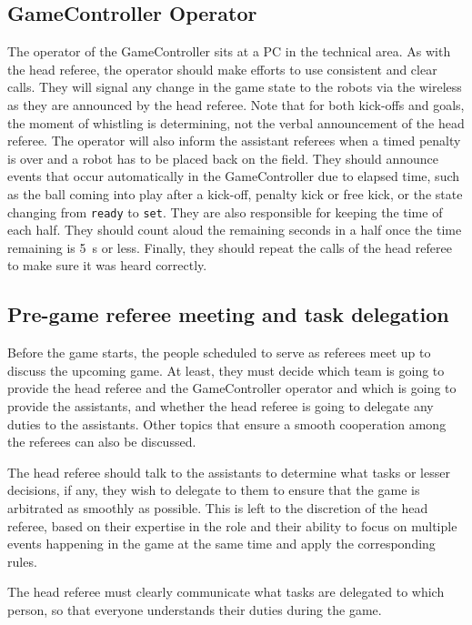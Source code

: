 \subsection{GameController Operator}
\label{sec:gameControllerOp}

The operator of the GameController sits at a PC in the technical area.
As with the head referee, the operator should make efforts to use consistent and clear calls.
They will signal any change in the game state to the robots via the wireless as they are announced by the head referee.
Note that for both kick-offs and goals, the moment of whistling is determining, not the verbal announcement of the head referee.
The operator will also inform the assistant referees when a timed penalty is over and a robot has to be placed back on the field.
They should announce events that occur automatically in the GameController due to elapsed time, such as the ball coming into play after a kick-off, penalty kick or free kick, or the state changing from \texttt{ready} to \texttt{set}.
They are also responsible for keeping the time of each half.
They should count aloud the remaining seconds in a half once the time remaining is \qty{5}{\second} or less.
Finally, they should repeat the calls of the head referee to make sure it was heard correctly.

\subsection{Pre-game referee meeting and task delegation}
\label{sec:referee_delegation}

Before the game starts, the people scheduled to serve as referees meet up to discuss the
upcoming game. At least, they must decide which team is going to provide the head
referee and the GameController operator and which is going to provide the assistants,
and whether the head referee is going to delegate any duties to the assistants.
Other topics that ensure a smooth cooperation among the referees can also be discussed.

The head referee should talk to the assistants to determine
what tasks or lesser decisions, if any, they wish to delegate to them
to ensure that the game is arbitrated as smoothly as possible.
This is left to the discretion of the head referee, based on their expertise in the role
and their ability to focus on multiple events happening in the game at the same time
and apply the corresponding rules.

The head referee must clearly communicate what tasks are delegated
to which person, so that everyone understands their duties during the game.

